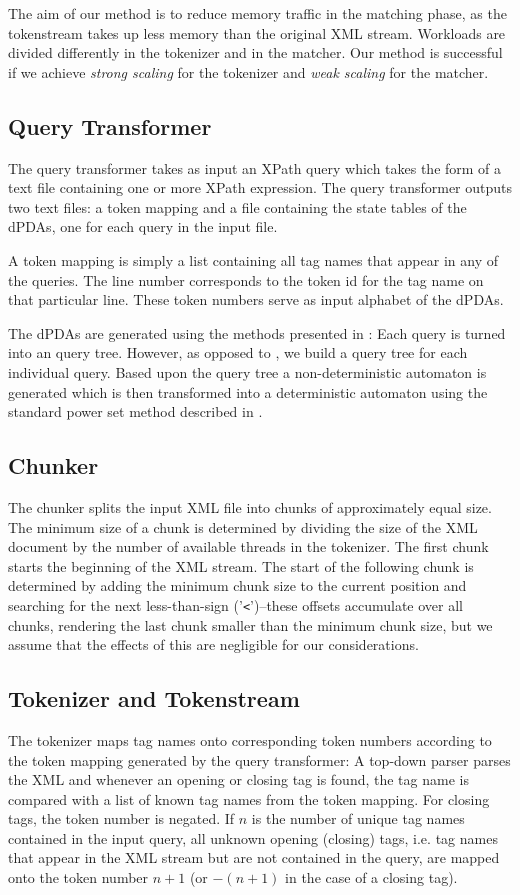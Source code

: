 The aim of our method is to reduce memory traffic in the matching phase, as the
tokenstream takes up less memory than the original XML stream. Workloads are
divided differently in the tokenizer and in the matcher. Our method is
successful if we achieve \emph{strong scaling} for the tokenizer and \emph{weak
scaling} for the matcher.

\subsection{Query Transformer}
The query transformer takes as input an XPath query which takes the form of a
text file containing one or more XPath expression. The query transformer outputs
two text files: a token mapping and a file containing the state tables of
the dPDAs, one for each query in the input file.

A token mapping is simply a list containing all tag names that appear in any of
the queries. The line number corresponds to the token id for the tag
name on that particular line. These token numbers serve as input alphabet of
the dPDAs.

The dPDAs are generated using the methods presented in \cite{Green2004}: Each
query is turned into an query tree. However, as opposed to
\cite{Green2004}, we build a query tree for each individual query.
Based upon the query tree a non-deterministic automaton is generated which is
then transformed into a deterministic automaton using the standard power set
method described in \cite{Hopcroft2006}.

\subsection{Chunker}
The chunker splits the input XML file into chunks of approximately equal size.
The minimum size of a chunk is determined by dividing the size of the XML
document by the number of available threads in the tokenizer. The first chunk
starts the beginning of the XML stream. The start of the following chunk is
determined by adding the minimum chunk size to the current position and
searching for the next less-than-sign ('\texttt{<}')–these offsets accumulate
over all chunks, rendering the last chunk smaller than the minimum chunk size,
but we assume that the effects of this are negligible for our considerations.

\subsection{Tokenizer and Tokenstream}
The tokenizer maps tag names onto corresponding token numbers according to the
token mapping generated by the query transformer: A top-down parser parses the
XML and whenever an opening or closing tag is found, the tag name is compared
with a list of known tag names from the token mapping. For closing tags, the
token number is negated. If $n$ is the number of unique tag names contained in
the input query, all unknown opening (closing) tags, i.e. tag names that appear
in the XML stream but are not contained in the query, are mapped onto the token
number $n+1$ (or $-(n+1)$ in the case of a closing tag).

